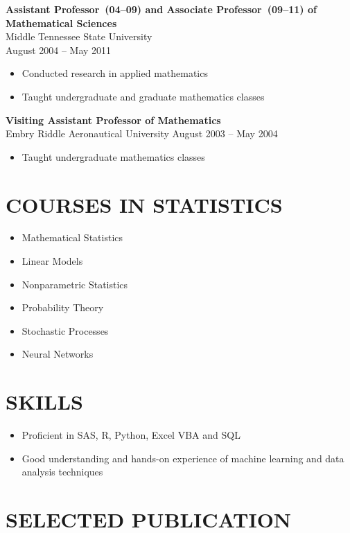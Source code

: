 \documentclass[11pt]{res} %
\begin{document}
\begin{resume}
{\bf Assistant Professor~(04--09) and Associate Professor~(09--11) of Mathematical Sciences}  \\
Middle Tennessee State University \\ 
August 2004 -- May 2011
\vspace{0.05in}
 \begin{itemize} \itemsep -2pt
   \item Conducted research in applied mathematics
  \item Taught undergraduate and graduate mathematics classes 
\end{itemize} 

{\bf Visiting Assistant Professor of Mathematics}\\
Embry Riddle Aeronautical University
August 2003 -- May 2004
\vspace{0.05in}
 \begin{itemize} \itemsep -2pt
  \item Taught undergraduate mathematics classes 
\end{itemize} 

\section{COURSES IN STATISTICS}
\begin{itemize}
\item Mathematical Statistics
\item Linear Models
\item Nonparametric Statistics
\item Probability Theory 
\item Stochastic Processes 
\item Neural Networks
\end{itemize}

\section{SKILLS} 
\begin{itemize} 
\item Proficient in SAS, R, Python, Excel VBA and SQL
\item Good understanding and hands-on experience of machine learning and data analysis techniques
\end{itemize}

\section{SELECTED PUBLICATION} 



\end{resume}
\end{document}
